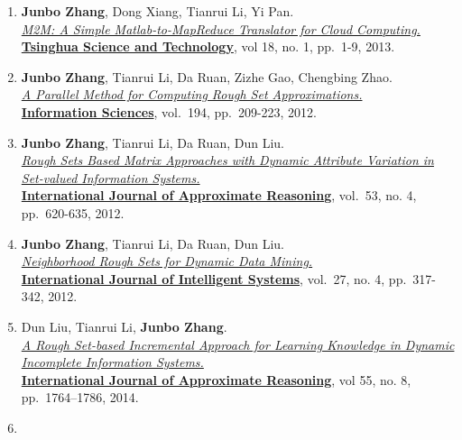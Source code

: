 \documentclass[10pt,a4paper]{article}
\begin{document}
\begin{enumerate}
\item
  \textbf{Junbo Zhang}, Dong Xiang, Tianrui Li, Yi Pan.\\
  \href{http://ieeexplore.ieee.org/xpl/articleDetails.jsp?tp=\&arnumber=6449402\&contentType=Journals+\%26+Magazines\&queryText\%3DM2M\%3A+A+simple+Matlab-to-MapReduce+translator+for+Cloud+Computing}{\emph{M2M:
  A Simple Matlab-to-MapReduce Translator for Cloud Computing.}}\\
  \href{http://qhxb.lib.tsinghua.edu.cn/english/}{\textbf{Tsinghua
  Science and Technology}}, vol 18, no. 1, pp.~1-9, 2013.
\item
  \textbf{Junbo Zhang}, Tianrui Li, Da Ruan, Zizhe Gao, Chengbing
  Zhao.\\ \href{http://dx.doi.org/10.1016/j.ins.2011.12.036}{\emph{A
  Parallel Method for Computing Rough Set Approximations.}}\\
  \href{http://www.journals.elsevier.com/information-sciences}{\textbf{Information
  Sciences}}, vol.~194, pp.~209-223, 2012.
\item
  \textbf{Junbo Zhang}, Tianrui Li, Da Ruan, Dun Liu.\\
  \href{http://dx.doi.org/10.1016/j.ijar.2012.01.001}{\emph{Rough Sets
  Based Matrix Approaches with Dynamic Attribute Variation in Set-valued
  Information Systems.}}\\
  \href{http://www.journals.elsevier.com/international-journal-of-approximate-reasoning}{\textbf{International
  Journal of Approximate Reasoning}}, vol.~53, no. 4, pp.~620-635, 2012.
\item
  \textbf{Junbo Zhang}, Tianrui Li, Da Ruan, Dun Liu.\\
  \href{http://dx.doi.org/10.1002/int.21523}{\emph{Neighborhood Rough
  Sets for Dynamic Data Mining.}}\\
  \href{http://onlinelibrary.wiley.com/journal/10.1002/{[}ISSN{]}1098-111X}{\textbf{International
  Journal of Intelligent Systems}}, vol.~27, no. 4, pp.~317-342, 2012.
\item
  Dun Liu, Tianrui Li, \textbf{Junbo Zhang}.\\
  \href{http://dx.doi.org/10.1016/j.ijar.2014.05.009}{\emph{A Rough
  Set-based Incremental Approach for Learning Knowledge in Dynamic
  Incomplete Information Systems.}}\\
  \href{http://www.journals.elsevier.com/international-journal-of-approximate-reasoning}{\textbf{International
  Journal of Approximate Reasoning}}, vol 55, no. 8, pp.~1764--1786,
  2014.
\item

\end{enumerate}
\end{document}
